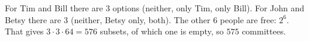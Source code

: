 For Tim and Bill there are $3$ options (neither, only Tim, only Bill). For John and Betsy there are $3$ (neither, Betsy only, both). The other $6$ people are free: $2^6$. That gives $3\cdot3\cdot64=576$ subsets, of which one is empty, so $\boxed{575}$ committees.
